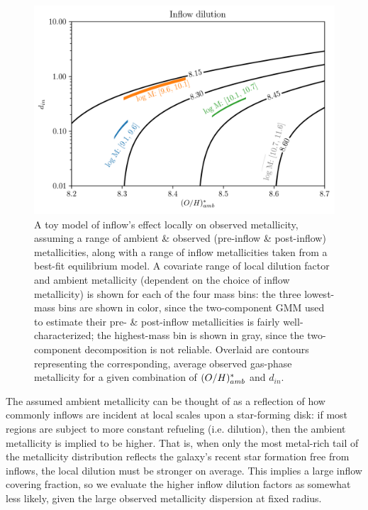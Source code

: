 \begin{figure}
    \centering
    \includegraphics[width=\textwidth]{oh-ambient_d-in_color-oh-obs}
    \caption[A toy model of inflow's diluting effects on local metallicity and the mass increase of the associated gas reservoir.]{\fixspacing A toy model of inflow's effect locally on observed metallicity, assuming a range of ambient \& observed (pre-inflow \& post-inflow) metallicities, along with a range of inflow metallicities taken from a best-fit equilibrium model. A covariate range of local dilution factor and ambient metallicity (dependent on the choice of inflow metallicity) is shown for each of the four mass bins: the three lowest-mass bins are shown in color, since the two-component GMM used to estimate their pre- \& post-inflow metallicities is fairly well-characterized; the highest-mass bin is shown in gray, since the two-component decomposition is not reliable. Overlaid are contours representing the corresponding, average observed gas-phase metallicity for a given combination of $(O/H)^*_{amb}$ and $d_{in}$.}
    \label{fig:oh-ambient_d-in_color-oh-obs}
\end{figure}

The assumed ambient metallicity can be thought of as a reflection of how commonly inflows are incident at local scales upon a star-forming disk: if most regions are subject to more constant refueling (i.e. dilution), then the ambient metallicity is implied to be higher. That is, when only the most metal-rich tail of the metallicity distribution reflects the galaxy's recent star formation free from inflows, the local dilution must be stronger on average. This implies a large inflow covering fraction, so we evaluate the higher inflow dilution factors as somewhat less likely, given the large observed metallicity dispersion at fixed radius.

